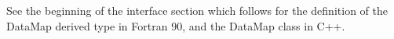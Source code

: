 

See the beginning of the interface section which
follows for the definition of the DataMap derived type
in Fortran 90, and the DataMap class in C++.


